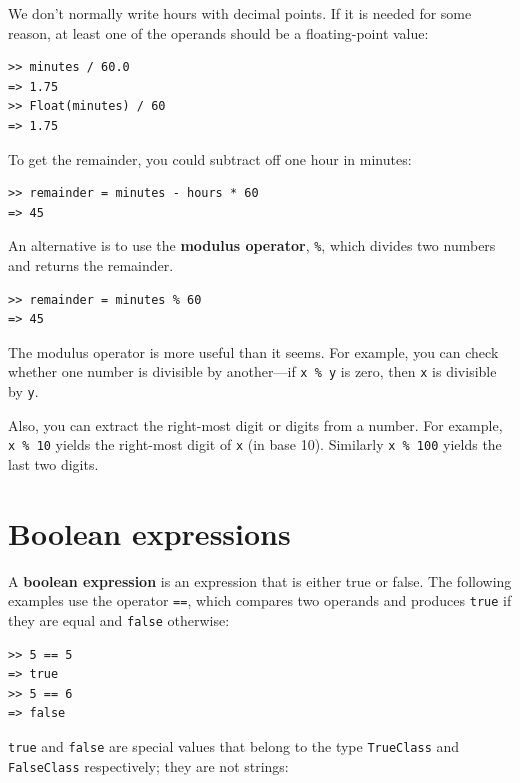\documentclass[10pt]{book}
\begin{document}
We don't normally write hours with decimal points.  If it is needed
for some reason, at least one of the operands should be a floating-point value:

\begin{verbatim}
>> minutes / 60.0
=> 1.75
>> Float(minutes) / 60
=> 1.75
\end{verbatim}

To get the remainder, you could subtract off one hour in minutes:

\begin{verbatim}
>> remainder = minutes - hours * 60
=> 45
\end{verbatim}


An alternative is to use the {\bf modulus operator}, \verb"%", which
divides two numbers and returns the remainder.

\begin{verbatim}
>> remainder = minutes % 60
=> 45
\end{verbatim}
%
The modulus operator is more useful than it seems.  For
example, you can check whether one number is divisible by another---if
{\tt x \% y} is zero, then {\tt x} is divisible by {\tt y}.

Also, you can extract the right-most digit
or digits from a number.  For example, {\tt x \% 10} yields the
right-most digit of {\tt x} (in base 10).  Similarly {\tt x \% 100}
yields the last two digits.



\section{Boolean expressions}

A {\bf boolean expression} is an expression that is either true
or false.  The following examples use the 
operator {\tt ==}, which compares two operands and produces
{\tt true} if they are equal and {\tt false} otherwise:

\begin{verbatim}
>> 5 == 5
=> true
>> 5 == 6
=> false
\end{verbatim}
%
{\tt true} and {\tt false} are special
values that belong to the type {\tt TrueClass} and {\tt FalseClass}
respectively; they are not strings:
\end{document}
